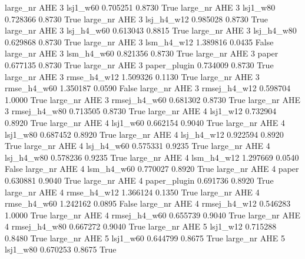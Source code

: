   large_nr      AHE                 3     lsj1_w60    0.705251      0.8730    True
  large_nr      AHE                 3     lsj1_w80    0.728366      0.8730    True
  large_nr      AHE                 3   lsj_h4_w12    0.985028      0.8730    True
  large_nr      AHE                 3   lsj_h4_w60    0.613043      0.8815    True
  large_nr      AHE                 3   lsj_h4_w80    0.629868      0.8730    True
  large_nr      AHE                 3   lsm_h4_w12    1.389816      0.0435   False
  large_nr      AHE                 3   lsm_h4_w60    0.821356      0.8730    True
  large_nr      AHE                 3        paper    0.677135      0.8730    True
  large_nr      AHE                 3 paper_plugin    0.734009      0.8730    True
  large_nr      AHE                 3  rmse_h4_w12    1.509326      0.1130    True
  large_nr      AHE                 3  rmse_h4_w60    1.350187      0.0590   False
  large_nr      AHE                 3 rmsej_h4_w12    0.598704      1.0000    True
  large_nr      AHE                 3 rmsej_h4_w60    0.681302      0.8730    True
  large_nr      AHE                 3 rmsej_h4_w80    0.713505      0.8730    True
  large_nr      AHE                 4     lsj1_w12    0.732904      0.8920    True
  large_nr      AHE                 4     lsj1_w60    0.662154      0.9040    True
  large_nr      AHE                 4     lsj1_w80    0.687452      0.8920    True
  large_nr      AHE                 4   lsj_h4_w12    0.922594      0.8920    True
  large_nr      AHE                 4   lsj_h4_w60    0.575331      0.9235    True
  large_nr      AHE                 4   lsj_h4_w80    0.578236      0.9235    True
  large_nr      AHE                 4   lsm_h4_w12    1.297669      0.0540   False
  large_nr      AHE                 4   lsm_h4_w60    0.770027      0.8920    True
  large_nr      AHE                 4        paper    0.630881      0.9040    True
  large_nr      AHE                 4 paper_plugin    0.691736      0.8920    True
  large_nr      AHE                 4  rmse_h4_w12    1.366124      0.1350    True
  large_nr      AHE                 4  rmse_h4_w60    1.242162      0.0895   False
  large_nr      AHE                 4 rmsej_h4_w12    0.546283      1.0000    True
  large_nr      AHE                 4 rmsej_h4_w60    0.655739      0.9040    True
  large_nr      AHE                 4 rmsej_h4_w80    0.667272      0.9040    True
  large_nr      AHE                 5     lsj1_w12    0.715288      0.8480    True
  large_nr      AHE                 5     lsj1_w60    0.644799      0.8675    True
  large_nr      AHE                 5     lsj1_w80    0.670253      0.8675    True
